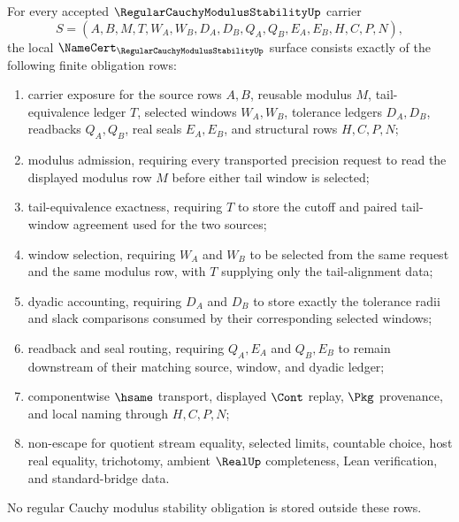 \begin{theorem}
\label{thm:regular-cauchy-modulus-stability-namecert-obligations}
For every accepted $\RegularCauchyModulusStabilityUp$ carrier
$$
S=(A,B,M,T,W_A,W_B,D_A,D_B,Q_A,Q_B,E_A,E_B,H,C,P,N),
$$
the local $\NameCert_{\RegularCauchyModulusStabilityUp}$ surface consists exactly of the following finite obligation rows:
\begin{enumerate}
\item carrier exposure for the source rows $A,B$, reusable modulus $M$, tail-equivalence ledger $T$, selected windows $W_A,W_B$, tolerance ledgers $D_A,D_B$, readbacks $Q_A,Q_B$, real seals $E_A,E_B$, and structural rows $H,C,P,N$;
\item modulus admission, requiring every transported precision request to read the displayed modulus row $M$ before either tail window is selected;
\item tail-equivalence exactness, requiring $T$ to store the cutoff and paired tail-window agreement used for the two sources;
\item window selection, requiring $W_A$ and $W_B$ to be selected from the same request and the same modulus row, with $T$ supplying only the tail-alignment data;
\item dyadic accounting, requiring $D_A$ and $D_B$ to store exactly the tolerance radii and slack comparisons consumed by their corresponding selected windows;
\item readback and seal routing, requiring $Q_A,E_A$ and $Q_B,E_B$ to remain downstream of their matching source, window, and dyadic ledger;
\item componentwise $\hsame$ transport, displayed $\Cont$ replay, $\Pkg$ provenance, and local naming through $H,C,P,N$;
\item non-escape for quotient stream equality, selected limits, countable choice, host real equality, trichotomy, ambient $\RealUp$ completeness, Lean verification, and standard-bridge data.
\end{enumerate}
No regular Cauchy modulus stability obligation is stored outside these rows.
\end{theorem}

